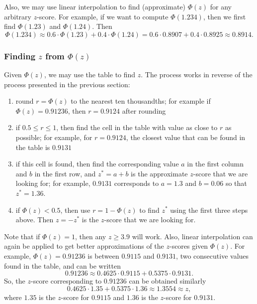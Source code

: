 \documentclass[12pt]{article}
\begin{document}
Also, we may use linear interpolation to find (approximate) $\Phi(z)$ for any arbitrary $z$-score.  For example, if we want to compute $\Phi(1.234)$, then we first find $\Phi(1.23)$ and $\Phi(1.24)$.  Then $$\Phi(1.234)\approx 0.6\cdot \Phi(1.23)+ 0.4\cdot \Phi(1.24)=0.6\cdot 0.8907+0.4\cdot 0.8925 \approx 0.8914.$$

\subsubsection*{Finding $z$ from $\Phi(z)$}  

Given $\Phi(z)$, we may use the table to find $z$.  The process works in reverse of the process presented in the previous section:
\begin{enumerate}
\item round $r=\Phi(z)$ to the nearest ten thousandths; for example if $\Phi(z)=0.91236$, then $r=0.9124$ after rounding
\item if $0.5\le r\le 1$, then find the cell in the table with value as close to $r$ as possible; for example, for $r=0.9124$, the closest value that can be found in the table is $0.9131$
\item if this cell is found, then find the corresponding value $a$ in the first column and $b$ in the first row, and $z^*=a+b$ is the approximate $z$-score that we are looking for; for example, $0.9131$ corresponds to $a=1.3$ and $b=0.06$ so that $z^*=1.36$.
\item if $\Phi(z)<0.5$, then use $r=1-\Phi(z)$ to find $z^*$ using the first three steps above.  Then $z=-z^*$ is the $z$-score that we are looking for.
\end{enumerate}

Note that if $\Phi(z)=1$, then any $z\ge 3.9$ will work.  Also, linear interpolation can again be applied to get better approximations of the $z$-scores given $\Phi(z)$.  For example, $\Phi(z)=0.91236$ is between $0.9115$ and $0.9131$, two consecutive values found in the table, and can be written 
$$0.91236 \approx 0.4625 \cdot 0.9115 + 0.5375 \cdot 0.9131.$$
So, the $z$-score corresponding to $0.91236$ can be obtained similarly
$$0.4625 \cdot 1.35 + 0.5375 \cdot 1.36 \approx 1.3554 \approx z,$$
where $1.35$ is the $z$-score for $0.9115$ and $1.36$ is the $z$-score for $0.9131$.
\end{document}
